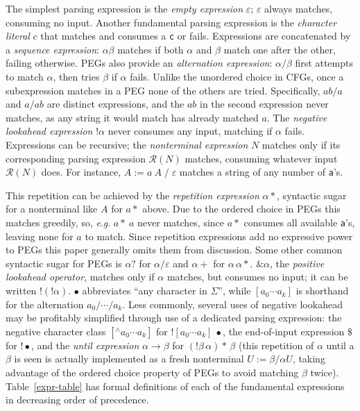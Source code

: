\documentclass[submission,copyright,creativecommons]{eptcs}
\newcommand{\Rule}{\mathcal{R}}
\newcommand{\eosp}{\mathrm{\textit{\$}}}
\newcommand{\anyc}{\bullet}
\newcommand{\eg}{\textit{e}.\textit{g}.}
\begin{document}
The simplest parsing expression is the \emph{empty expression} $\varepsilon$; $\varepsilon$ always matches, consuming no input. 
Another fundamental parsing expression is the \emph{character literal} $c$ that matches and consumes a \texttt{c} or fails. 
Expressions are concatenated by a \emph{sequence expression}: $\alpha\beta$ matches if both $\alpha$ and $\beta$ match one after the other, failing otherwise. 
PEGs also provide an \emph{alternation expression}: $\alpha/\beta$ first attempts to match $\alpha$, then tries $\beta$ if $\alpha$ fails. 
Unlike the unordered choice in CFGs, once a subexpression matches in a PEG none of the others are tried. 
Specifically, $ab/a$ and $a/ab$ are distinct expressions, and the $ab$ in the second expression never matches, as any string it would match has already matched $a$. 
The \emph{negative lookahead expression} $!\alpha$ never consumes any input, matching if $\alpha$ fails. 
Expressions can be recursive; the \emph{nonterminal expression} $N$ matches only if its corresponding parsing expression $\Rule(N)$ matches, consuming whatever input $\Rule(N)$ does. 
For instance, $A := a\:A\;/\;\varepsilon$ matches a string of any number of \texttt{a}'s.

This repetition can be achieved by the \emph{repetition expression} $\alpha*$, syntactic sugar for a nonterminal like $A$ for $a*$ above. Due to the ordered choice in PEGs this matches greedily, so, \eg{} ${a*}~a$ never matches, since $a*$ consumes all available \texttt{a}'s, leaving none for $a$ to match. 
Since repetition expressions add no expressive power to PEGs this paper generally omits them from discussion.
Some other common syntactic sugar for PEGs is $\alpha?$ for $\alpha/\varepsilon$ and $\alpha+$ for $\alpha\,{\alpha*}$.
$\&\alpha$, the \emph{positive lookahead operator}, matches only if $\alpha$ matches, but consumes no input; it can be written $!(!\alpha)$. 
$\anyc$ abbreviates ``any character in $\Sigma$'', while $[a_0 \cdots a_k]$ is shorthand for the alternation $a_0/\cdots/a_k$. 
Less commonly, several uses of negative lookahead may be profitably simplified through use of a dedicated parsing expression: the negative character class $[^\wedge a_0 \cdots a_k]$ for $![a_0 \cdots a_k]\:\anyc$, the end-of-input expression $\eosp$ for $!\anyc$, and the \emph{until expression} $\alpha \rightarrow \beta$ for $(!\beta\,\alpha)\!*\,\beta$ (this repetition of $\alpha$ until a $\beta$ is seen is actually implemented as a fresh nonterminal $U := \beta/\alpha U$, taking advantage of the ordered choice property of PEGs to avoid matching $\beta$ twice).
Table~\ref{expr-table} has formal definitions of each of the fundamental expressions in decreasing order of precedence.
\end{document}
